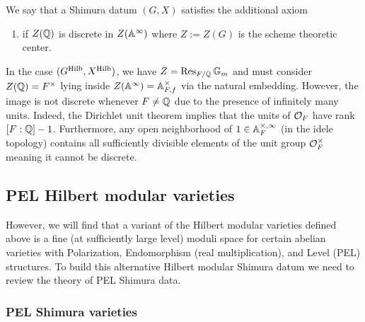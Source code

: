 \documentclass[main.tex]{subfiles}
\begin{document}
\begin{defn}
We say that a Shimura datum $(G, X)$ satisfies the additional axiom
\begin{enumerate}
\item[(SV5)] if $Z(\mathbb{Q})$ is discrete in $Z(\mathbb{A}^{\infty})$ where $Z := Z(G)$ is the scheme theoretic center.
\end{enumerate}
\end{defn}


\begin{example}
In the case $(G^{\operatorname{\mathrm{Hilb}}}, X^{\operatorname{\mathrm{Hilb}}})$, we have $Z = \operatorname{\mathrm{Res}}_{F/\mathbb{Q}} \mathbb{G}_m$ and must consider $Z(\mathbb{Q}) = F^{\times}$ lying inside $Z(\mathbb{A}^{\infty}) = \mathbb{A}^{\times}_{F,f}$ via the natural embedding. However, the image is not discrete whenever $F \neq \mathbb{Q}$ due to the presence of infinitely many units. Indeed, the Dirichlet unit theorem implies that the units of $\mathcal{O}_F$ have rank $[F : \mathbb{Q}]-1$. Furthermore, any open neighborhood of $1 \in \mathbb{A}^{\times,\infty}_F$ (in the idele topology) contains all sufficiently divisible elements of the unit group $\mathcal{O}_F^{\times}$ meaning it cannot be discrete.   
\end{example}




\subsection{PEL Hilbert modular varieties}

However, we will find that a variant of the Hilbert modular varieties defined above is a fine (at sufficiently large level) moduli space for certain abelian varieties with Polarization, Endomorphism (real multiplication), and Level (PEL) structures. To build this alternative Hilbert modular Shimura datum we need to review the theory of PEL Shimura data. 

\subsubsection{PEL Shimura varieties}
\end{document}
